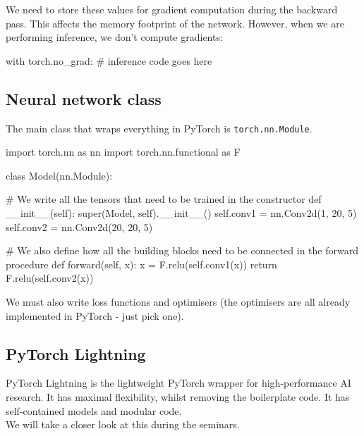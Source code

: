 We need to store these values for gradient computation during the backward pass. This affects the memory footprint of the network. However, when we are performing inference, we don't compute gradients:
\begin{python}
with torch.no_grad:
	# inference code goes here
\end{python}

\minirule

\subsection{Neural network class}
The main class that wraps everything in PyTorch is \texttt{torch.nn.Module}.
\begin{python}
import torch.nn as nn
import torch.nn.functional as F

class Model(nn.Module):

	# We write all the tensors that need to be trained in the constructor
	def __init__(self):
		super(Model, self).__init__()
		self.conv1 = nn.Conv2d(1, 20, 5)
		self.conv2 = nn.Conv2d(20, 20, 5)
	
	# We also define how all the building blocks need to be connected in the forward procedure
	def forward(self, x):
		x = F.relu(self.conv1(x))
		return F.relu(self.conv2(x))
\end{python}

We must also write loss functions and optimisers (the optimisers are all already implemented in PyTorch - just pick one). 

\minirule

\subsection{PyTorch Lightning}
PyTorch Lightning is the lightweight PyTorch wrapper for high-performance AI research. It has maximal flexibility, whilst removing the boilerplate code. It has self-contained models and modular code.\\

We will take a closer look at this during the seminars.









